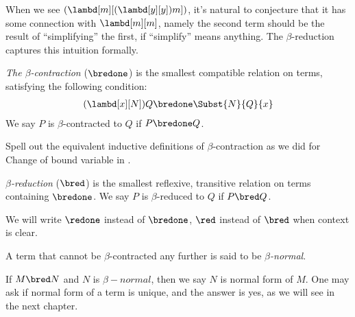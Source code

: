 \documentclass[../../../include/open-logic-section]{subfiles}
\begin{document}

When we see $(\lambd[m][(\lambd[y][y]) m])$, it's natural to
conjecture that it has some connection with $\lambd[m][m]$,
namely the second term should be the result of ``simplifying'' the first, if
``simplify'' means anything. The $\beta$-reduction captures this
intuition formally.

\begin{defn} 
  \emph{The $\beta$-contraction} ($\bredone$) is the smallest compatible
  relation on terms, satisfying the following condition:
  \begin{align*}
    (\lambd[x][N])Q \bredone \Subst{N}{Q}{x} 
  \end{align*}
  We say $P$ is $\beta$-contracted to $Q$ if $P \bredone Q$. 
\end{defn}

\begin{prob} 
  Spell out the equivalent inductive definitions of $\beta$-contraction as we
  did for Change of bound variable in .
\end{prob}
  
\begin{defn} 
  \emph{$\beta$-reduction} ($\bred$) is the smallest reflexive, transitive
  relation on terms containing $\bredone$.
  We say $P$ is $\beta$-reduced to $Q$ if $P \bred Q$.
\end{defn}
We will write $\redone$ instead of $\bredone$, $\red$ instead of
$\bred$ when context is clear.

\begin{defn}
A term that cannot be $\beta$-contracted any further is said to be
\emph{$\beta$-normal}. 
\end{defn}
If $M \bred N$ and $N$ is $\beta-normal$, then we say $N$ is normal
form of $M$. One may ask if normal form of a term is unique, and the
answer is yes, as we will see in the next chapter.
\end{document}
